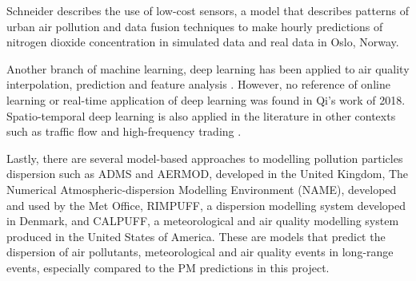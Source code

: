 Schneider \cite{low_cost} describes the use of low-cost sensors, a model that describes patterns of urban air pollution and data fusion techniques to make hourly predictions of nitrogen dioxide concentration in simulated data and real data in Oslo, Norway.

Another branch of machine learning, deep learning has been applied to air quality interpolation, prediction and feature analysis \cite{qi}. However, no reference of online learning or real-time application of deep learning was found in Qi's work of 2018. Spatio-temporal deep learning is also applied in the literature in other contexts such as traffic flow and high-frequency trading \cite{trading}.


Lastly, there are several model-based approaches to modelling pollution particles dispersion such as ADMS and AERMOD, developed in the United Kingdom, The Numerical Atmospheric-dispersion Modelling Environment (NAME), developed and used by the Met Office, RIMPUFF, a dispersion modelling system developed in Denmark, and CALPUFF, a meteorological and air quality modelling system produced in the United States of America. These are models that predict the dispersion of air pollutants, meteorological and air quality events in long-range events, especially compared to the PM predictions in this project.